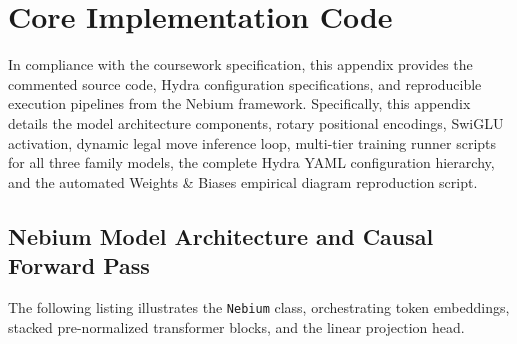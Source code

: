 \section{Core Implementation Code}
\label{sec:code_appendix}

In compliance with the coursework specification, this appendix provides the commented source code, Hydra configuration specifications, and reproducible execution pipelines from the Nebium framework. Specifically, this appendix details the model architecture components, rotary positional encodings, SwiGLU activation, dynamic legal move inference loop, multi-tier training runner scripts for all three family models, the complete Hydra YAML configuration hierarchy, and the automated Weights \& Biases empirical diagram reproduction script.

\subsection{Nebium Model Architecture and Causal Forward Pass}
\label{sec:code_nebium}
The following listing illustrates the \texttt{Nebium} class, orchestrating token embeddings, stacked pre-normalized transformer blocks, and the linear projection head.

